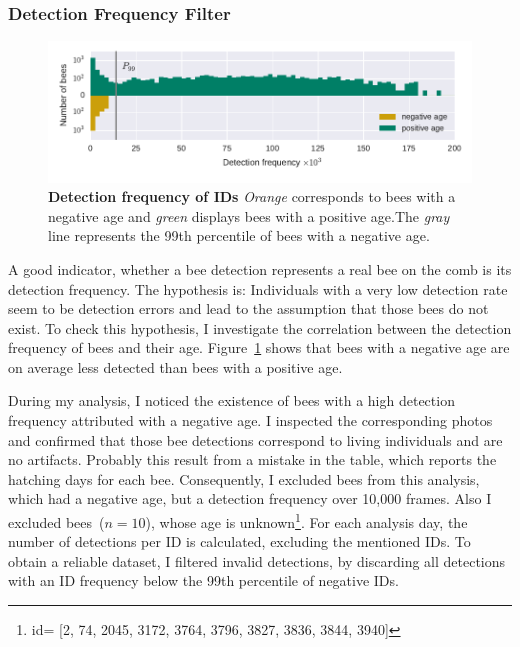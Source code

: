 \subsubsection{Detection Frequency Filter}
\label{subsubsec:dataset:filter}
\begin{figure}[t]
	\centering
	\includegraphics[width=1.0\textwidth]{Figures/filter}
	\caption[Detection frequency of IDs]{\textbf{Detection frequency of IDs} \emph{Orange} corresponds to bees with a negative age and \emph{green} displays bees with a positive age.\protect\footnotemark The \emph{gray} line represents the 99th percentile of bees with a negative age.}
	\label{fig:filter}
\end{figure}

A good indicator, whether a bee detection represents a real bee on the comb is its detection frequency.
The hypothesis is:
Individuals with a very low detection rate seem to be detection errors and lead to the assumption that those bees do not exist.
To check this hypothesis, I investigate the correlation between the detection frequency of bees and their age.
Figure~\ref{fig:filter} shows that bees with a negative age are on average less detected than bees with a positive age.

During my analysis, I noticed the existence of bees with a high detection frequency attributed with a negative age. I inspected the corresponding photos and confirmed that those bee detections correspond to living individuals and are no artifacts. Probably this result from a mistake in the table, which reports the hatching days for each bee.
Consequently, I excluded bees from this analysis, which had a negative age, but a detection frequency over 10,000 frames. Also I excluded bees~($n=10$), whose age is unknown\footnote{id= [2,
    74,
    2045,
    3172,
    3764,
    3796,
    3827,
    3836,
    3844,
    3940]}.
For each analysis day, the number of detections per ID is calculated, excluding the mentioned IDs.
To obtain a reliable dataset, I filtered invalid detections, by discarding all detections with an ID frequency below the 99th percentile of negative IDs.


